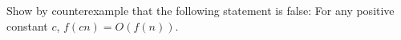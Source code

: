 Show by counterexample that the following statement is false:
For any positive constant $c$, $f(cn) = O(f(n))$.
